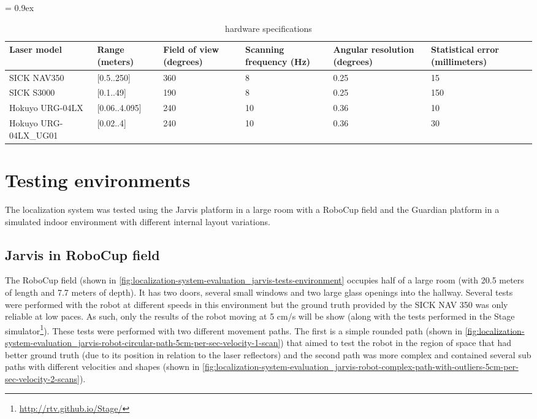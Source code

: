\begin{table}
	\caption{ hardware specifications}
	\tabulinesep = 0.9ex
	\centering
	\small
	\begin{tabu} { X[2.5,m,c] | X[m,c] X[m,c] X[m,c] X[m,c] X[m,c] }
		\rowfont{\bfseries\itshape} Laser model & Range (meters) & Field of view (degrees) & Scanning frequency (Hz) & Angular resolution (degrees) & Statistical error (millimeters) \\
		\hline
		{\small SICK NAV350} 			& [0.5..250] 	& 360 	& 8 	& 0.25 	& 15 	\\
		{\small SICK S3000} 			& [0.1..49] 	& 190 	& 8 	& 0.25 	& 150 	\\
		{\small Hokuyo URG-04LX} 		& [0.06..4.095] & 240 	& 10 	& 0.36 	& 10 	\\
		{\small Hokuyo URG-04LX\_UG01} 	& [0.02..4] 	& 240 	& 10 	& 0.36 	& 30 	\\
	\end{tabu}
	\label{tab:localization-system-evaluation_laser-hardware-specifications}
\end{table}


\section{Testing environments}

The localization system was tested using the Jarvis platform in a large room with a RoboCup field and the Guardian platform in a simulated indoor environment with different internal layout variations.


\subsection{Jarvis in RoboCup field}

The RoboCup field (shown in \cref{fig:localization-system-evaluation_jarvis-tests-environment} occupies half of a large room (with 20.5 meters of length and 7.7 meters of depth). It has two doors, several small windows and two large glass openings into the hallway. Several tests were performed with the robot at different speeds in this environment but the ground truth provided by the SICK NAV 350 was only reliable at low paces. As such, only the results of the robot moving at 5 cm/s will be show (along with the tests performed in the Stage simulator\footnote{\url{http://rtv.github.io/Stage/}}). These tests were performed with two different movement paths. The first is a simple rounded path (shown in \cref{fig:localization-system-evaluation_jarvis-robot-circular-path-5cm-per-sec-velocity-1-scan}) that aimed to test the robot in the region of space that had better ground truth (due to its position in relation to the laser reflectors) and the second path was more complex and contained several sub paths with different velocities and shapes (shown in \cref{fig:localization-system-evaluation_jarvis-robot-complex-path-with-outliers-5cm-per-sec-velocity-2-scans}).


